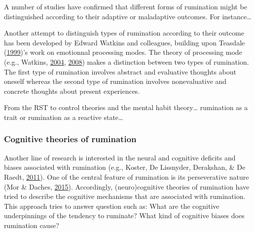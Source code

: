 \documentclass[a4paper,12pt,twoside,openright,oldfontcommands]{memoir}
\begin{document}
A number of studies have confirmed that different forms of rumination might be distinguished according to their adaptive or maladaptive outcomes. For instance\ldots{}

Another attempt to distinguish types of rumination according to their outcome has been developed by Edward Watkins and colleagues, building upon Teasdale (\protect\hyperlink{ref-teasdale_emotional_1999}{1999})'s work on emotionnal processing modes. The theory of processing mode (e.g., Watkins, \protect\hyperlink{ref-watkins_adaptive_2004}{2004}, \protect\hyperlink{ref-Watkins2008}{2008}) makes a distinction between two types of rumination. The first type of rumination involves abstract and evaluative thoughts about oneself whereas the second type of rumination involves nonevaluative and concrete thoughts about present experiences.

From the RST to control theories and the mental habit theory\ldots{} rumination as a trait or rumination as a reactive state\ldots{}

\hypertarget{cognitive-theories-of-rumination}{%
\subsubsection{Cognitive theories of rumination}\label{cognitive-theories-of-rumination}}

Another line of research is interested in the neural and cognitive deficits and biases associated with rumination (e.g., Koster, De Lissnyder, Derakshan, \& De Raedt, \protect\hyperlink{ref-Koster2011}{2011}). One of the central feature of rumination is its perseverative nature (Mor \& Daches, \protect\hyperlink{ref-mor_ruminative_2015}{2015}). Accordingly, (neuro)cognitive theories of rumination have tried to describe the cognitive mechanisms that are associated with rumination. This approach tries to answer question such as: What are the cognitive underpinnings of the tendency to ruminate? What kind of cognitive biases does rumination cause?
\end{document}
